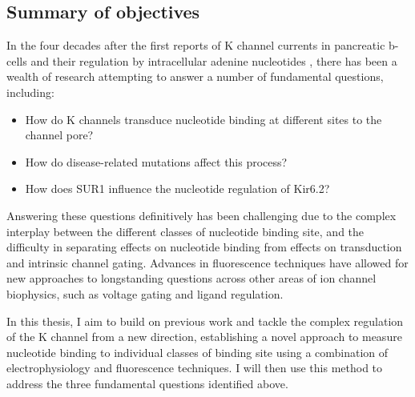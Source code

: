 \begin{mccorrection}

\section{Summary of objectives}

In the four decades after the first reports of K\ATP{} channel currents in pancreatic \textgreek{b}-cells and their regulation by intracellular adenine nucleotides \cite{ashcroft_glucose_1984-1, rorsman_glucose_1985-1}, there has been a wealth of research attempting to answer a number of fundamental questions, including:
\begin{itemize}
\item How do K\ATP{} channels transduce nucleotide binding at different sites to the channel pore?
\item How do disease-related mutations affect this process?
\item How does SUR1 influence the nucleotide regulation of Kir6.2?
\end{itemize}
Answering these questions definitively has been challenging due to the complex interplay between the different classes of nucleotide binding site, and the difficulty in separating effects on nucleotide binding from effects on transduction and intrinsic channel gating.
Advances in fluorescence techniques have allowed for new approaches to longstanding questions across other areas of ion channel biophysics, such as voltage gating and ligand regulation.

In this thesis, I aim to build on previous work and tackle the complex regulation of the K\ATP{} channel from a new direction, establishing a novel approach to measure nucleotide binding to individual classes of binding site using a combination of electrophysiology and fluorescence techniques.
I will then use this method to address the three fundamental questions identified above.

\end{mccorrection}